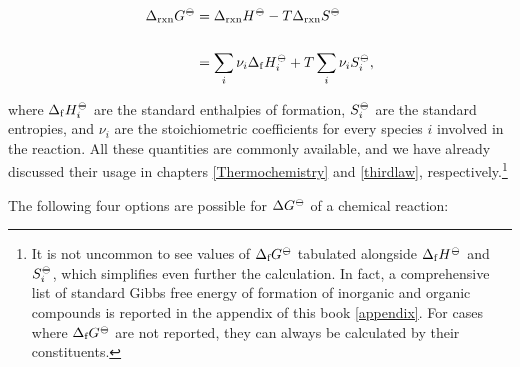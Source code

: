 \documentclass[
  9pt,
]{extbook}
\theoremstyle{definition}
\theoremstyle{definition}
\theoremstyle{definition}
\theoremstyle{remark}
\begin{document}
\begin{equation}
\begin{aligned}
\Delta_{\text{rxn}} G^{-\kern-6pt{\ominus}\kern-6pt-}&= \Delta_{\text{rxn}} H^{-\kern-6pt{\ominus}\kern-6pt-}-T \Delta_{\text{rxn}} S^{-\kern-6pt{\ominus}\kern-6pt-}\\
\\
&= \sum_i \nu_i \Delta_{\mathrm{f}} H_i^{-\kern-6pt{\ominus}\kern-6pt-}+ T \sum_i \nu_i S_i^{-\kern-6pt{\ominus}\kern-6pt-},
\end{aligned}
\label{eq:gibbseq2}
\end{equation}

where \(\Delta_{\mathrm{f}} H_i^{-\kern-6pt{\ominus}\kern-6pt-}\) are the standard enthalpies of formation, \(S_i^{-\kern-6pt{\ominus}\kern-6pt-}\) are the standard entropies, and \(\nu_i\) are the stoichiometric coefficients for every species \(i\) involved in the reaction. All these quantities are commonly available, and we have already discussed their usage in chapters \ref{Thermochemistry} and \ref{thirdlaw}, respectively.\footnote{It is not uncommon to see values of \(\Delta_{\text{f}} G^{-\kern-6pt{\ominus}\kern-6pt-}\) tabulated alongside \(\Delta_{\mathrm{f}} H^{-\kern-6pt{\ominus}\kern-6pt-}\) and \(S_i^{-\kern-6pt{\ominus}\kern-6pt-}\), which simplifies even further the calculation. In fact, a comprehensive list of standard Gibbs free energy of formation of inorganic and organic compounds is reported in the appendix of this book \ref{appendix}. For cases where \(\Delta_{\text{f}} G^{-\kern-6pt{\ominus}\kern-6pt-}\) are not reported, they can always be calculated by their constituents.}

The following four options are possible for \(\Delta G^{-\kern-6pt{\ominus}\kern-6pt-}\) of a chemical reaction:
\end{document}
